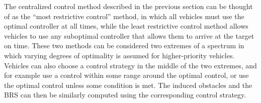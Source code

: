 \begin{remark}
The centralized control method described in the previous section can be thought of as the ``most restrictive control'' method, in which all vehicles must use the optimal controller at all times, while the least restrictive control method allows vehicles to use any suboptimal controller that allows them to arrive at the target on time. These two methods can be considered two extremes of a spectrum in which varying degrees of optimality is assumed for higher-priority vehicles. Vehicles can also choose a control strategy in the middle of the two extremes, and for example use a control within some range around the optimal control, or use the optimal control unless some condition is met. The induced obstacles and the BRS can then be similarly computed using the corresponding control strategy.
\end{remark}